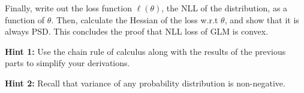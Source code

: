 \clearpage
\item {}
Finally, write out the loss function $\ell(\theta)$, the NLL of the
distribution, as a function of $\theta$. Then, calculate the Hessian of the
loss w.r.t $\theta$, and show that it is always PSD. This concludes the proof
that NLL loss of GLM is convex.

\textbf{Hint 1:} Use the chain rule of calculus along with the results of
the previous parts to simplify your derivations.

\textbf{Hint 2:} Recall that variance of any probability distribution is
non-negative.

\ifnum{}\fi
